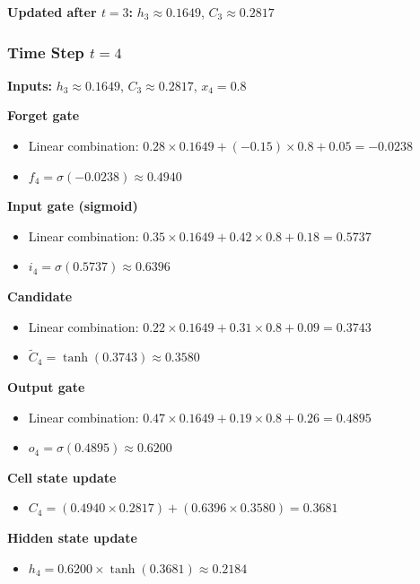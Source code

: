 \documentclass[12pt]{article}
\begin{document}
\textbf{Updated after $t=3$:} $h_3 \approx 0.1649$, $C_3 \approx 0.2817$

\subsubsection*{Time Step $t = 4$}

\textbf{Inputs:} $h_3 \approx 0.1649$, $C_3 \approx 0.2817$, $x_4 = 0.8$

\textcolor{headingRed}{\textbf{Forget gate}}
\begin{itemize}[leftmargin=*]
    \item Linear combination: $0.28 \times 0.1649 + (-0.15) \times 0.8 + 0.05 = -0.0238$
    \item $f_4 = \sigma(-0.0238) \approx 0.4940$
\end{itemize}

\textcolor{headingRed}{\textbf{Input gate (sigmoid)}}
\begin{itemize}[leftmargin=*]
    \item Linear combination: $0.35 \times 0.1649 + 0.42 \times 0.8 + 0.18 = 0.5737$
    \item $i_4 = \sigma(0.5737) \approx 0.6396$
\end{itemize}

\textcolor{headingRed}{\textbf{Candidate}}
\begin{itemize}[leftmargin=*]
    \item Linear combination: $0.22 \times 0.1649 + 0.31 \times 0.8 + 0.09 = 0.3743$
    \item $\tilde{C}_4 = \tanh(0.3743) \approx 0.3580$
\end{itemize}

\textcolor{headingRed}{\textbf{Output gate}}
\begin{itemize}[leftmargin=*]
    \item Linear combination: $0.47 \times 0.1649 + 0.19 \times 0.8 + 0.26 = 0.4895$
    \item $o_4 = \sigma(0.4895) \approx 0.6200$
\end{itemize}

\textcolor{headingRed}{\textbf{Cell state update}}
\begin{itemize}[leftmargin=*]
    \item $C_4 = (0.4940 \times 0.2817) + (0.6396 \times 0.3580) = 0.3681$
\end{itemize}

\textcolor{headingRed}{\textbf{Hidden state update}}
\begin{itemize}[leftmargin=*]
    \item $h_4 = 0.6200 \times \tanh(0.3681) \approx 0.2184$
\end{itemize}
\end{document}
